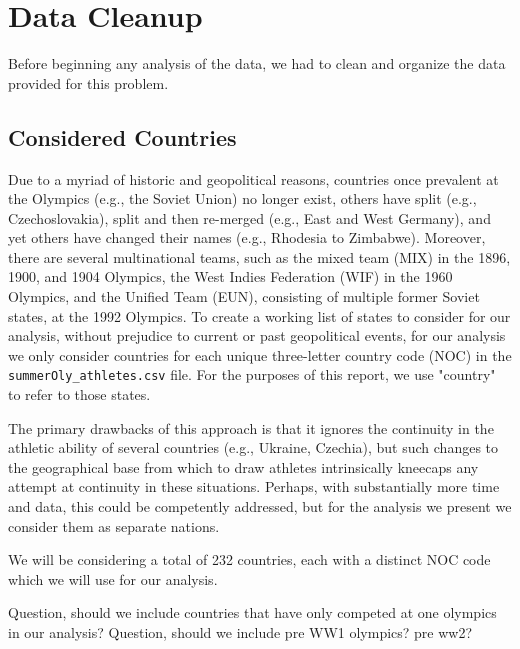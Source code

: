 \documentclass[12pt]{article}
\begin{document}
\section{Data Cleanup}

Before beginning any analysis of the data, we had to clean and organize the data provided for this problem. 


\subsection{Considered Countries}
Due to a myriad of historic and geopolitical reasons, countries once prevalent at the Olympics (e.g., the Soviet Union) no longer exist, others have split (e.g., Czechoslovakia), split and then re-merged (e.g., East and West Germany), and yet others have changed their names (e.g., Rhodesia to Zimbabwe). 
Moreover, there are several multinational teams, such as the mixed team (MIX) in the 1896, 1900, and 1904 Olympics, the West Indies Federation (WIF) in the 1960 Olympics, and the Unified Team (EUN), consisting of multiple former Soviet states, at the 1992 Olympics. 
To create a working list of states to consider for our analysis, without prejudice to current or past geopolitical events, for our analysis we only consider countries for each unique three-letter country code (NOC) in the \verb|summerOly_athletes.csv| file.
For the purposes of this report, we use "country" to refer to those states. 

The primary drawbacks of this approach is that it ignores the continuity in the athletic ability of several countries (e.g., Ukraine, Czechia), but such changes to the geographical base from which to draw athletes intrinsically kneecaps any attempt at continuity in these situations. 
Perhaps, with substantially more time and data, this could be competently addressed, but for the analysis we present we consider them as separate nations.

We will be considering a total of 232 countries, each with a distinct NOC code which we will use for our analysis.






Question, should we include countries that have only competed at one olympics in our analysis? 
Question, should we include pre WW1 olympics? pre ww2?
\end{document}
